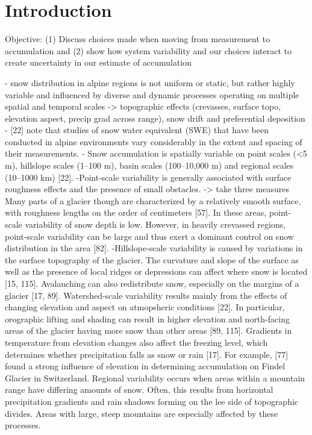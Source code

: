 \documentclass[twoside,twocolumn]{article}
\begin{document}


\section{Introduction}

Objective: (1) Discuss choices made when moving from measurement to accumulation and (2) show how system variability and our choices interact to create uncertainty in our estimate of accumulation

- snow distribution in alpine regions is not uniform or static, but
rather highly variable and influenced by diverse and dynamic processes operating on multiple spatial and temporal scales -> topographic effects (crevasses, surface topo, elevation aspect, precip grad across range), snow drift and preferential deposition
-  [22] note that studies of snow water equivalent (SWE) that have been conducted in
alpine environments vary considerably in the extent and spacing of their measurements.
- Snow accumulation is spatially variable on point scales (<5 m), hillslope scales (1–100 m),
basin scales (100–10,000 m) and regional scales (10–1000 km) [22].
-Point-scale variability is generally associated with surface roughness effects and the
presence of small obstacles. -> take three measures
Many parts of a glacier though
are characterized by a relatively smooth surface, with roughness lengths on the order of
centimeters [57]. In these areas, point-scale variability of snow depth is low. However, in
heavily crevassed regions, point-scale variability can be large and thus exert a dominant
control on snow distribution in the area [82].
-Hillslope-scale variability is caused by variations in the surface topography of the glacier.
The curvature and slope of the surface as well as the presence of local ridges or depressions
can affect where snow is located [15, 115]. Avalanching can also redistribute snow, especially
on the margins of a glacier [17, 89].
Watershed-scale variability results mainly from the effects of changing elevation and
aspect on atmopsheric conditions [22]. In particular, orographic lifting and shading can
result in higher elevation and north-facing areas of the glacier having more snow than other
areas [89, 115]. Gradients in temperature from elevation changes also affect the freezing
level, which determines whether precipitation falls as snow or rain [17]. For example, [77]
found a strong influence of elevation in determining accumulation on Findel Glacier in
Switzerland.
Regional variability occurs when areas within a mountain range have differing amounts of
snow. Often, this results from horizontal precipitation gradients and rain shadows forming
on the lee side of topographic divides. Areas with large, steep mountains are especially
affected by these processes.
\end{document}
